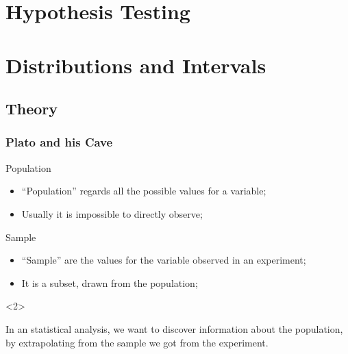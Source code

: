 \documentclass[10pt]{beamer}
\begin{document}
\section{Hypothesis Testing}
\begin{frame}
  \frametitle{}
\end{frame}


\section{Distributions and Intervals}
\subsection{Theory}

\begin{frame}
  \frametitle{Plato and his Cave}
  \begin{block}{Population}
    \begin{itemize}
    \item ``Population'' regards all the possible values for a variable;
    \item Usually it is impossible to directly observe;
    \end{itemize}
  \end{block}
  \begin{block}{Sample}
    \begin{itemize}
    \item ``Sample'' are the values for the variable observed in an experiment;
    \item It is a subset, drawn from the population;
    \end{itemize}
  \end{block}

  \medskip

  \begin{onlyenv}<2>
    \begin{block}{}
      In an statistical analysis, we want to discover information
      about the population, by extrapolating from the sample we got
      from the experiment.
    \end{block}
  \end{onlyenv}
\end{frame}
\end{document}
